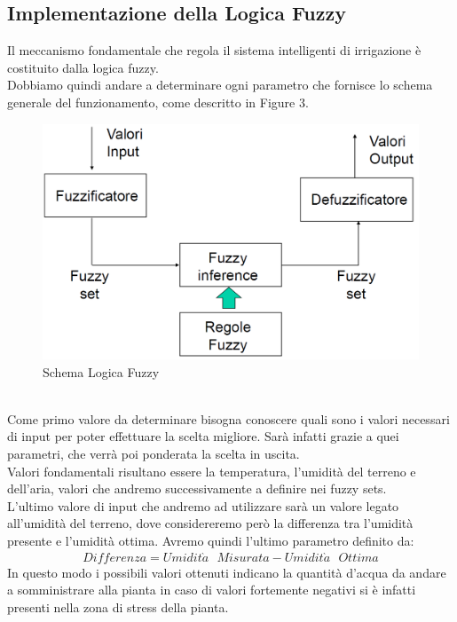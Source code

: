 \documentclass[conference,10pt]{IEEEtran}
\begin{document}
\subsection{Implementazione della Logica Fuzzy}\label{sec:symo}
Il meccanismo fondamentale che regola il sistema intelligenti di irrigazione è costituito dalla logica fuzzy.\\
Dobbiamo quindi andare a determinare ogni parametro che fornisce lo schema generale del funzionamento, come descritto in Figure 3.
\begin{figure}[ht]
	\centering
	\includegraphics[width=0.8\linewidth]{images/schemafuzzy.png}
	\caption{Schema Logica Fuzzy}
	\label{fig:MAD}
\end{figure}
\\Come primo valore da determinare bisogna conoscere quali sono i valori necessari di input per poter effettuare la scelta migliore. Sarà infatti grazie a quei parametri, che verrà poi ponderata la scelta in uscita.\\
Valori fondamentali risultano essere la temperatura, l'umidità del terreno e dell'aria, valori che andremo successivamente a definire nei fuzzy sets.\\
L'ultimo valore di input che andremo ad utilizzare sarà un valore legato all'umidità del terreno, dove considereremo però la differenza tra l'umidità presente e l'umidità ottima. Avremo quindi l'ultimo parametro definito da:\\
\begin{equation*}
\begin{split}
Differenza = Umidit\grave{a}\text{ }Misurata-Umidit\grave{a}\text{ }Ottima
\end{split}
\end{equation*}  
In questo modo i possibili valori ottenuti indicano la quantità d'acqua da andare a somministrare alla pianta in caso di valori fortemente negativi si è infatti presenti nella zona di stress della pianta.\\
\end{document}
